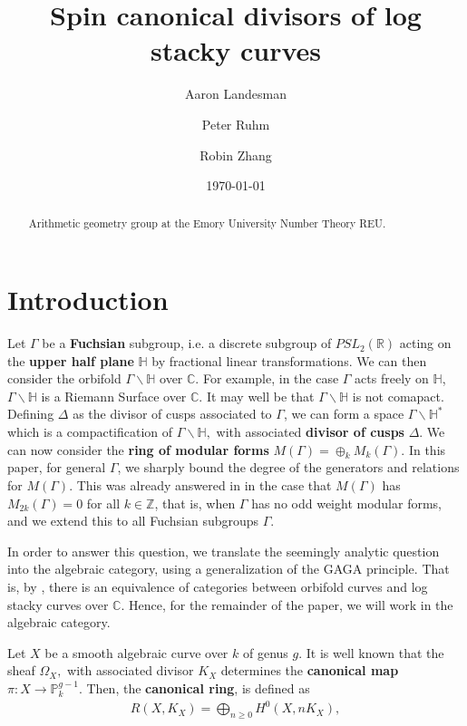 \documentclass{amsart}
\title{Spin canonical divisors of log stacky curves}
\author{Aaron Landesman}
\author{Peter Ruhm}
\author{Robin Zhang}
\date{\today}
\theoremstyle{plain}
\theoremstyle{definition}
\theoremstyle{remark}
\numberwithin{equation}{section}
\newcommand\bh{{\mathbb H}}
\newcommand\BC{{\mathbb C}}
\newcommand\BR{{\mathbb R}}
\newcommand\BP{{\mathbb P}}
\newcommand\BZ{{\mathbb Z}}
\begin{document}
\begin{abstract}
  Arithmetic geometry group at the Emory University Number Theory
	REU.
\end{abstract}

\maketitle

\tableofcontents




\section{Introduction}

Let $\Gamma$ be a {\bf Fuchsian} subgroup, i.e. a discrete subgroup of $PSL_2(\BR)$ acting on the {\bf upper half plane} $\bh$ by fractional linear transformations. We can then consider the orbifold $\Gamma \backslash \bh$ over $\BC$. For example, in the case $\Gamma$ acts freely on $\bh$, $\Gamma \backslash \bh$ is a Riemann Surface over $\BC$. It may well be that $\Gamma \backslash \bh$ is not comapact. Defining $\Delta$ as the divisor of cusps associated to $\Gamma$, we can form a space $\Gamma \backslash \bh^*$ which is a compactification of $\Gamma \backslash \bh,$ with associated {\bf divisor of cusps} $\Delta$. We can now consider the {\bf ring of modular forms} $M(\Gamma) = \oplus_k M_k(\Gamma)$. In this paper, for general $\Gamma$, we sharply bound the degree of the generators and relations for $M(\Gamma).$ This was already answered in \cite[Chapters 7-9]{vzb:stacky} in the case that $M(\Gamma)$ has $M_{2k}(\Gamma) = 0$ for all $k \in \BZ$, that is, when $\Gamma$ has no odd weight modular forms, and we extend this to all Fuchsian subgroups $\Gamma$.

In order to answer this question, we translate the seemingly analytic question into the algebraic category, using a generalization of the GAGA principle. That is, by \cite[Proposition 6.1.5]{vzb:stacky}, there is an equivalence of categories between orbifold curves and log stacky curves over $\BC$. Hence, for the remainder of the paper, we will work in the algebraic category.

Let $X$ be a smooth algebraic curve over $k$ of genus $g$. It is well known that the sheaf $\Omega_X,$ with associated divisor $K_X$ determines the {\bf canonical map} $\pi:X \rightarrow \BP_k^{g-1}.$ Then, the {\bf canonical ring}, is defined as
\begin{align*}
	R(X,K_X) = \bigoplus_{n \geq 0} H^0(X,nK_X),
\end{align*}
\end{document}
